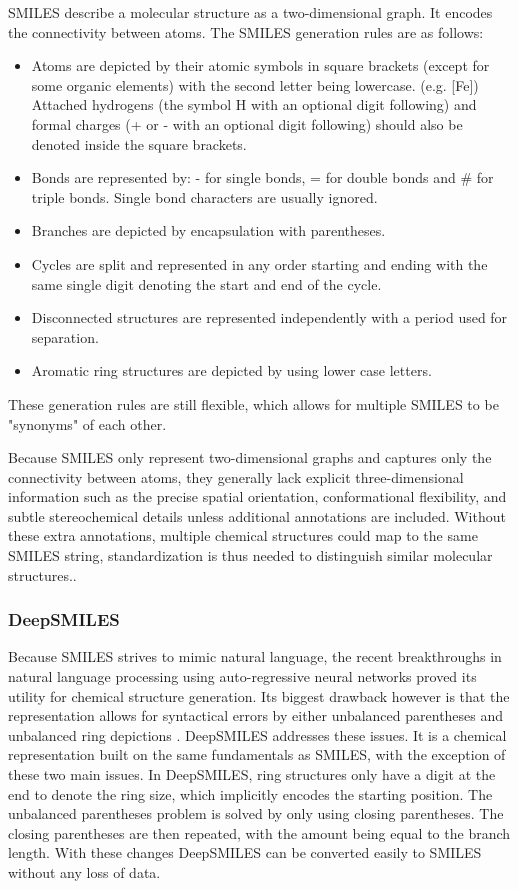 SMILES describe a molecular structure as a two-dimensional graph. It encodes the connectivity between atoms.
The SMILES generation rules are as follows:

\begin{itemize}
    \item Atoms are depicted by their atomic symbols in square brackets (except for some organic elements) with the second letter being lowercase. (e.g. [Fe])
    Attached hydrogens (the symbol H with an optional digit following) and formal charges (+ or - with an optional digit following) should also be denoted inside the square brackets.
    \item Bonds are represented by: - for single bonds, = for double bonds and \# for triple bonds. Single bond characters are usually ignored.
    \item Branches are depicted by encapsulation with parentheses.
    \item Cycles are split and represented in any order starting and ending with the same single digit denoting the start and end of the cycle.
    \item Disconnected structures are represented independently with a period used for separation.
    \item Aromatic ring structures are depicted by using lower case letters.
\end{itemize}

These generation rules are still flexible, which allows for multiple SMILES to be "synonyms" of each other.

Because SMILES only represent two-dimensional graphs and captures only the connectivity between atoms, 
they generally lack explicit three-dimensional information such as the precise spatial orientation, conformational flexibility, and subtle stereochemical details unless additional annotations are included. Without these extra annotations, multiple chemical structures could map to the same SMILES string, standardization is thus needed to distinguish similar molecular structures.\cite{heller2015inchi}.   

\subsubsection{DeepSMILES}

Because SMILES strives to mimic natural language, the recent breakthroughs in natural language processing using auto-regressive neural networks proved its utility for chemical structure generation. Its biggest drawback however is that the representation allows for syntactical errors by either unbalanced parentheses and unbalanced ring depictions \cite{o2018deepsmiles}. DeepSMILES \cite{o2018deepsmiles} addresses these issues. It is a chemical representation built on the same fundamentals as SMILES, with the exception of these two main issues. In DeepSMILES, ring structures only have a digit at the end to denote the ring size, which implicitly encodes the starting position. The unbalanced parentheses problem is solved by only using closing parentheses. The closing parentheses are then repeated, with the amount being equal to the branch length. With these changes DeepSMILES can be converted easily to SMILES without any loss of data.

